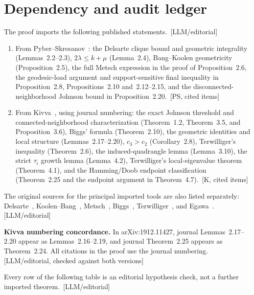 \documentclass[10pt]{amsart}
\theoremstyle{remark}
\newcommand{\prov}[1]{\unskip\, {\normalfont\scriptsize\color{provgray}\textsf{[#1]}}}
\begin{document}
\section{Dependency and audit ledger}
The proof imports the following published statements.\prov{LLM/editorial}
\begin{enumerate}
\item From Pyber--Skresanov~\cite{PyberSkresanov}: the Delsarte clique bound and geometric integrality (Lemmas~2.2--2.3), $2\lambda\le k+\mu$ (Lemma~2.4), Bang--Koolen geometricity (Proposition~2.5), the full Metsch expression in the proof of Proposition~2.6, the geodesic-load argument and support-sensitive final inequality in Proposition~2.8, Propositions~2.10 and~2.12--2.15, and the disconnected-neighborhood Johnson bound in Proposition~2.20.\prov{PS, cited items}
\item From Kivva~\cite{Kivva}, using journal numbering: the exact Johnson threshold and connected-neighborhood characterization (Theorem~1.2, Theorem~3.5, and Proposition~3.6), Biggs' formula (Theorem~2.10), the geometric identities and local structure (Lemmas~2.17--2.20), $c_3>c_2$ (Corollary~2.8), Terwilliger's inequality (Theorem~2.6), the induced-quadrangle lemma (Lemma~3.10), the strict $\tau_i$ growth lemma (Lemma~4.2), Terwilliger's local-eigenvalue theorem (Theorem~4.1), and the Hamming/Doob endpoint classification (Theorem~2.25 and the endpoint argument in Theorem~4.7).\prov{K, cited items}
\end{enumerate}
The original sources for the principal imported tools are also listed separately: Delsarte~\cite{Delsarte}, Koolen--Bang~\cite{KoolenBang}, Metsch~\cite{Metsch}, Biggs~\cite{Biggs}, Terwilliger~\cite{TerwilligerGirth,TerwilligerFeasibility}, and Egawa~\cite{Egawa}.\prov{LLM/editorial}

\medskip
\noindent\textbf{Kivva numbering concordance.}
In arXiv:1912.11427, journal Lemmas~2.17--2.20 appear as Lemmas~2.16--2.19, and journal Theorem~2.25 appears as Theorem~2.24. All citations in the proof use the journal numbering.\prov{LLM/editorial, checked against both versions}

\medskip
Every row of the following table is an editorial hypothesis check, not a further imported theorem.\prov{LLM/editorial}
\end{document}

